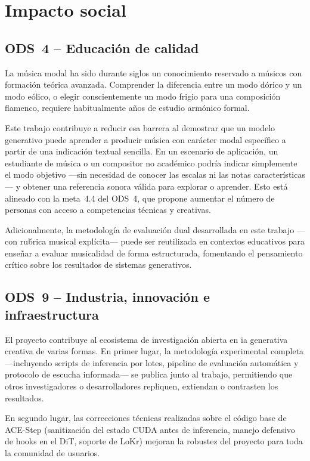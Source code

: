 \documentclass[%
    school=etsisi,%
    type=pfg,%
    degree=61CD,%
]{upm-report}
\begin{document}
\section{Impacto social}

\subsection{ODS~4 -- Educaci\'on de calidad}

La m\'usica modal ha sido durante siglos un conocimiento reservado a m\'usicos con formaci\'on te\'orica avanzada. Comprender la diferencia entre un modo d\'orico y un modo e\'olico, o elegir conscientemente un modo frigio para una composici\'on flamenco, requiere habitualmente a\~nos de estudio arm\'onico formal.

Este trabajo contribuye a reducir esa barrera al demostrar que un modelo generativo puede aprender a producir m\'usica con car\'acter modal espec\'ifico a partir de una indicaci\'on textual sencilla. En un escenario de aplicaci\'on, un estudiante de m\'usica o un compositor no acad\'emico podr\'ia indicar simplemente el modo objetivo ---sin necesidad de conocer las escalas ni las notas caracter\'isticas--- y obtener una referencia sonora v\'alida para explorar o aprender. Esto est\'a alineado con la meta~4.4 del ODS~4, que propone aumentar el n\'umero de personas con acceso a competencias t\'ecnicas y creativas.

Adicionalmente, la metodolog\'ia de evaluaci\'on dual desarrollada en este trabajo ---con ru\'brica musical expl\'icita--- puede ser reutilizada en contextos educativos para ense\~nar a evaluar musicalidad de forma estructurada, fomentando el pensamiento cr\'itico sobre los resultados de sistemas generativos.

\subsection{ODS~9 -- Industria, innovaci\'on e infraestructura}

El proyecto contribuye al ecosistema de investigaci\'on abierta en \gls{ia} generativa creativa de varias formas. En primer lugar, la metodolog\'ia experimental completa ---incluyendo scripts de inferencia por lotes, pipeline de evaluaci\'on autom\'atica y protocolo de escucha informada--- se publica junto al trabajo, permitiendo que otros investigadores o desarrolladores repliquen, extiendan o contrasten los resultados.

En segundo lugar, las correcciones t\'ecnicas realizadas sobre el c\'odigo base de ACE-Step (sanitizaci\'on del estado CUDA antes de inferencia, manejo defensivo de hooks en el DiT, soporte de LoKr) mejoran la robustez del proyecto para toda la comunidad de usuarios.
\end{document}
